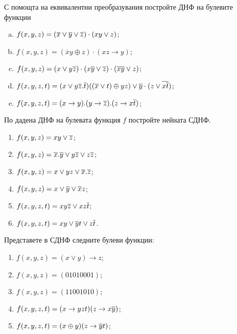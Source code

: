 \begin{problem} %
  С помощта на еквивалентни преобразувания постройте ДНФ на булевите функции
  \begin{enumerate}[a)]
  \item
    $f(x,y,z) = (\overline{x}\vee\overline{y}\vee\overline{z})\cdot(xy\vee z)$;
  \item
    $f(x,y,z) = (\overline{x}y\oplus z)\cdot(xz\rightarrow y)$;
  \item
    $f(x,y,z) = (x\vee y\overline{z})\cdot(x\overline{y}\vee\overline{z})\cdot(\overline{xy}\vee z)$;
  \item
    $f(x,y,z,t) = (x\vee y\overline{z}.\overline{t})((\overline{x}\vee t)\oplus yz)\vee \overline{y}\cdot(z\vee \overline{x\overline{t}})$;
  \item
    $f(x,y,z,t) = (x\rightarrow y).(y\rightarrow \overline{z}).(z\rightarrow x\overline{t})$;
  \end{enumerate}
\end{problem}

\begin{problem}%
  По дадена ДНФ на булевата функция $f$ постройте нейната СДНФ.
  \begin{enumerate}[1)]
  \item
    \marginpar{}
    $f(x,y,z) = xy\vee\overline{z}$;
  \item
    \marginpar{}
    $f(x,y,z) = \overline{x}.\overline{y} \vee y\overline{z} \vee z\overline{z}$;
  \item
    $f(x,y,z) = x\vee yz \vee \overline{x}.\overline{z}$;
  \item
    $f(x,y,z) = x\vee \overline{y}\vee \overline{x}z$;
  \item
    $f(x,y,z,t) = xy\overline{z} \vee xz\overline{t}$;
  \item
    $f(x,y,z,t) = xy \vee \overline{y}t \vee z\overline{t}$.
  \end{enumerate}
\end{problem}

\begin{problem}
  Представете в СДНФ следните булеви функции:
  \begin{enumerate}[1)]
  \item
    $f(x,y,z) = (x\vee y)\rightarrow z$;
  \item
    $f(x,y,z) = (01010001)$;
  \item
    $f(x,y,z) = (11001010)$;
  \item
    $f(x,y,z,t) = (x\rightarrow yzt)(z\rightarrow x\overline{y})$;
  \item
    $f(x,y,z,t) = (x\oplus y)(z\rightarrow \overline{y}t)$;
  \end{enumerate}
\end{problem}

